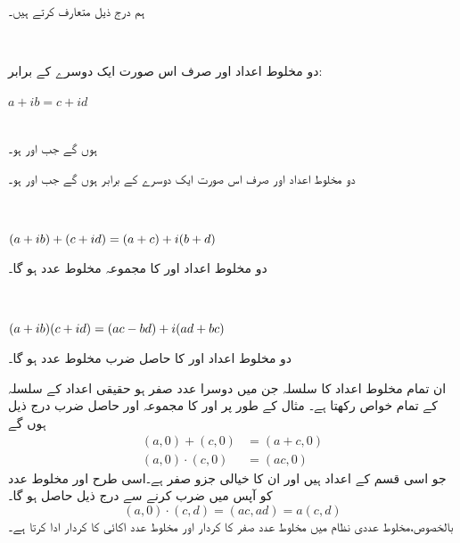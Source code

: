 ہم درج ذیل متعارف کرتے ہیں۔

\\
\begin{minipage}[t]{0.45\textwidth}
دو مخلوط اعداد  اور  صرف   اس صورت ایک دوسرے کے  برابر: \\
{\centerline{\(a+ib=c+id\)}}\\
ہوں گے جب   اور  ہو۔
\end{minipage}\hfill
\begin{minipage}[t]{0.45\textwidth}
دو مخلوط اعداد  اور    صرف  اس صورت ایک دوسرے کے  برابر ہوں گے جب  اور  ہو۔
\end{minipage}


\\
\begin{minipage}[t]{0.45\textwidth}
\((a+ib)+(c+id)\\=(a+c)+i(b+d)\)
\end{minipage}\hfill
\begin{minipage}[t]{0.45\textwidth}
دو مخلوط اعداد  اور  کا مجموعہ  مخلوط عدد   ہو گا۔
\end{minipage}

\\
\begin{minipage}[t]{0.45\textwidth}
\((a+ib)(c+id)\\
=(ac-bd)+i(ad+bc)\)
\end{minipage}\hfill
\begin{minipage}[t]{0.45\textwidth}
دو مخلوط اعداد  اور  کا  حاصل ضرب  مخلوط عدد   ہو گا۔
\end{minipage}

ان تمام مخلوط اعداد  کا سلسلہ جن میں دوسرا عدد  صفر ہو حقیقی اعداد  کے سلسلہ کے تمام خواص رکھتا ہے۔ مثال کے طور پر  اور   کا مجموعہ اور حاصل ضرب درج ذیل ہوں گے
\begin{align*}
(a,0)+(c,0)&=(a+c,0)\\
(a,0)\cdot (c,0)&=(ac,0)
\end{align*}
جو اسی قسم کے اعداد ہیں اور ان کا خیالی جزو صفر ہے۔اسی طرح   اور مخلوط عدد  کو آپس میں ضرب کرنے سے درج ذیل حاصل ہو گا۔
\[(a,0)\cdot (c,d)=(ac,ad)=a(c,d)\]
بالخصوص،مخلوط عددی نظام میں  مخلوط عدد    صفر کا کردار اور مخلوط عدد    اکائی کا کردار ادا کرتا ہے۔

